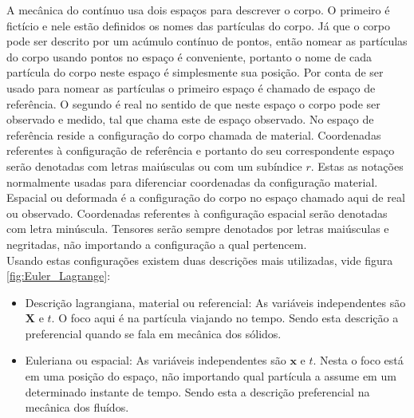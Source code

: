 A mecânica do contínuo usa dois espaços para descrever o corpo. O primeiro é fictício e nele estão definidos os nomes das partículas do corpo. Já que o corpo pode ser descrito por um acúmulo contínuo de pontos, então nomear as partículas do corpo usando pontos no espaço é conveniente, portanto o nome de cada partícula do corpo neste espaço é simplesmente sua posição. Por conta de ser usado para nomear as partículas o primeiro espaço é chamado de espaço de referência. O segundo é real no sentido de que neste espaço o corpo pode ser observado e medido, tal que \cite{gurtin_fried_anand_2013} chama este de espaço observado. No espaço de referência reside a configuração do corpo chamada de material. Coordenadas referentes à configuração de referência e portanto do seu correspondente espaço serão denotadas com letras maiúsculas ou com um subíndice $r$. Estas as notações normalmente usadas para diferenciar coordenadas da configuração material. Espacial ou deformada é a configuração do corpo no espaço chamado aqui de real ou observado. Coordenadas referentes à configuração espacial serão denotadas com letra minúscula. Tensores serão sempre denotados por letras maiúsculas e negritadas, não importando a configuração a qual pertencem. \\

Usando estas configurações existem duas descrições mais utilizadas, vide figura \ref{fig:Euler_Lagrange}:
\begin{itemize}
    \item Descrição lagrangiana, material ou referencial: As variáveis independentes são $ \boldsymbol{X} $ e $ t$. O foco aqui é na partícula viajando no tempo. Sendo esta descrição a preferencial quando se fala em mecânica dos sólidos.
    \item Euleriana ou espacial: As variáveis independentes são $ \boldsymbol{x} $ e $ t $. Nesta o foco está em uma posição do espaço, não importando qual partícula a assume em um determinado instante de tempo. Sendo esta a descrição preferencial na mecânica dos fluídos.
\end{itemize}

